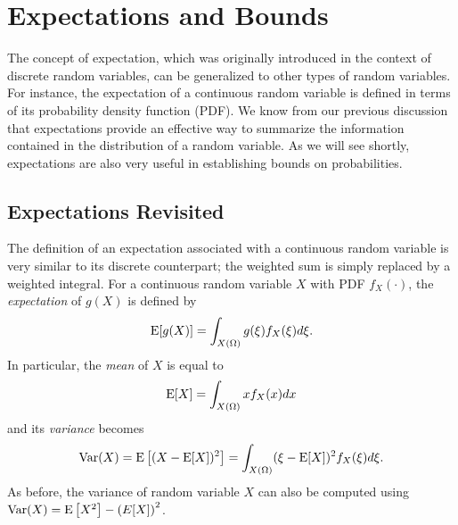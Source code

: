 \chapter{Expectations and Bounds}

The concept of expectation, which was originally introduced in the context of discrete random variables, can be generalized to other types of random variables.
For instance, the expectation of a continuous random variable is defined in terms of its probability density function (PDF).
We know from our previous discussion that expectations provide an effective way to summarize the information contained in the distribution of a random variable.
As we will see shortly, expectations are also very useful in establishing bounds on probabilities.


\section{Expectations Revisited}

The definition of an expectation associated with a continuous random variable is very similar to its discrete counterpart;
the weighted sum is simply replaced by a weighted integral.
For a continuous random variable $X$ with PDF $f_X(\cdot)$, the \emph{expectation} of $g(X)$ is defined by 
\begin{equation*}
\mathrm{E} [g(X)]
= \int_{X(\Omega)} g(\xi) f_X (\xi) d\xi .
\end{equation*}
In particular, the \emph{mean} of $X$ is equal to 
\begin{equation*}
\mathrm{E} [X]
= \int_{X(\Omega)} x f_X (x) dx
\end{equation*}
and its \emph{variance} becomes 
\begin{equation*}
\mathrm{Var} (X) = \mathrm{E} \left[ (X - \mathrm{E}[X])^2 \right]
= \int_{X(\Omega)} (\xi - \mathrm{E}[X])^2 f_X (\xi) d\xi .
\end{equation*}
As before, the variance of random variable $X$ can also be computed using $\mathrm{Var}(X) = \mathrm{E} \left[ X^2 \right] - \left( E[X] \right)^2$.

